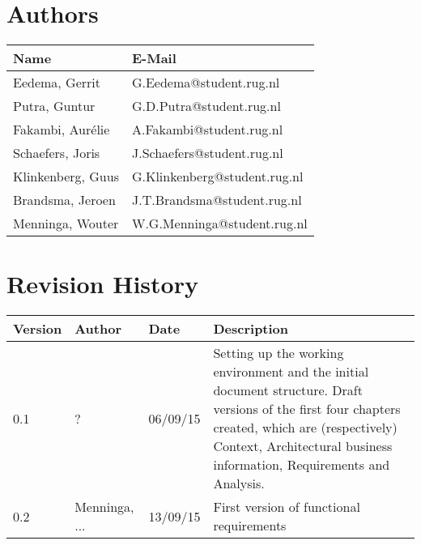 \section*{Authors}

\begin{tabular}{ l l }
    \textbf{Name} & \textbf{E-Mail} \\ \hline
	Eedema, Gerrit & G.Eedema@student.rug.nl\\
	Putra, Guntur & G.D.Putra@student.rug.nl\\
	Fakambi, Aurélie & A.Fakambi@student.rug.nl\\
	Schaefers, Joris & J.Schaefers@student.rug.nl\\
	Klinkenberg, Guus & G.Klinkenberg@student.rug.nl\\
	Brandsma, Jeroen & J.T.Brandsma@student.rug.nl\\
	Menninga, Wouter & W.G.Menninga@student.rug.nl\\ \hline
\end{tabular}

\section*{Revision History}
\begin{tabular}{p{} p{} p{} p{}}
    \textbf{Version} & \textbf{Author} &  \textbf{Date} & \textbf{Description}\\ \hline
    0.1 & ? & 06/09/15 & Setting up the working environment and the initial document structure. Draft versions of the first four chapters created, which are (respectively) Context, Architectural business information, Requirements and Analysis. \\
    \hline
    
    0.2 & Menninga, ... & 13/09/15 & First version of functional requirements \\
    \hline
\end{tabular}